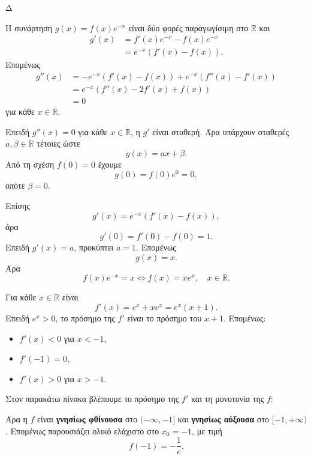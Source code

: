 \begin{thema}{Δ}
\begin{erwthma}
\item Η συνάρτηση $g(x)=f(x)e^{-x}$ είναι δύο φορές παραγωγίσιμη στο $\mathbb{R}$ και
\begin{align*}
g'(x)
&=f'(x)e^{-x}-f(x)e^{-x}\\
&=e^{-x}\left(f'(x)-f(x)\right).
\end{align*}
Επομένως
\begin{align*}
g''(x)
&=-e^{-x}\left(f'(x)-f(x)\right)
+e^{-x}\left(f''(x)-f'(x)\right)\\
&=e^{-x}\left(f''(x)-2f'(x)+f(x)\right)\\
&=0
\end{align*}
για κάθε $x\in\mathbb{R}$.

\item Επειδή $g''(x)=0$ για κάθε $x\in\mathbb{R}$, η $g'$ είναι σταθερή. Άρα υπάρχουν σταθερές $a,\beta\in\mathbb{R}$ τέτοιες ώστε
\[
g(x)=ax+\beta.
\]
Από τη σχέση $f(0)=0$ έχουμε
\[
g(0)=f(0)e^0=0,
\]
οπότε $\beta=0$.

Επίσης
\[
g'(x)=e^{-x}\left(f'(x)-f(x)\right),
\]
άρα
\[
g'(0)=f'(0)-f(0)=1.
\]
Επειδή $g'(x)=a$, προκύπτει $a=1$. Επομένως
\[
g(x)=x.
\]
Άρα
\[
f(x)e^{-x}=x
\Leftrightarrow
{f(x)=xe^x},
\quad x\in\mathbb{R}.
\]

\item Για κάθε $x\in\mathbb{R}$ είναι
\[
f'(x)=e^x+xe^x=e^x(x+1).
\]
Επειδή $e^x>0$, το πρόσημο της $f'$ είναι το πρόσημο του $x+1$. Επομένως:
\begin{itemize}
\item $f'(x)<0$ για $x<-1$,
\item $f'(-1)=0$,
\item $f'(x)>0$ για $x>-1$.
\end{itemize}
Στον παρακάτω πίνακα βλέπουμε το πρόσημο της $f'$ και τη μονοτονία της $f$:
\begin{center}
\end{center}

Άρα η $f$ είναι \textbf{γνησίως φθίνουσα} στο $(-\infty,-1]$ και \textbf{γνησίως αύξουσα} στο $[-1,+\infty)$. Επομένως παρουσιάζει ολικό ελάχιστο στο $x_0=-1$, με τιμή
\[
{f(-1)=-\frac{1}{e}}.
\]


\end{erwthma}
\end{thema}
